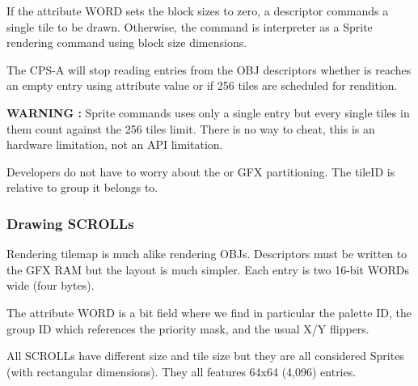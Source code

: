  


  

If the attribute WORD sets the block sizes to zero, a descriptor commands a single tile to be drawn.
 Otherwise, the command is interpreter as a Sprite rendering command using block size dimensions.


The CPS-A will stop reading entries from the OBJ descriptors whether is reaches an empty entry using attribute value  or if 256 tiles are scheduled for rendition.

\textbf{WARNING :} Sprite commands uses only a single entry but every single tiles in them count against the 256 tiles limit. There is no way to cheat, this is an hardware limitation, not an API limitation.


Developers do not have to worry about the  or GFX partitioning. The tileID is relative to group it belongs to.

\subsubsection{Drawing SCROLLs}

Rendering tilemap is much alike rendering OBJs. Descriptors must be written to the GFX RAM but the layout is much simpler. Each entry is two 16-bit WORDs wide (four bytes).

 

The attribute WORD is a bit field where we find in particular the palette ID, the group ID which references the priority mask, and the usual X/Y flippers.

 

All SCROLLs have different size and tile size but they are all considered Sprites (with rectangular dimensions). They all features 64x64 (4,096) entries. 

